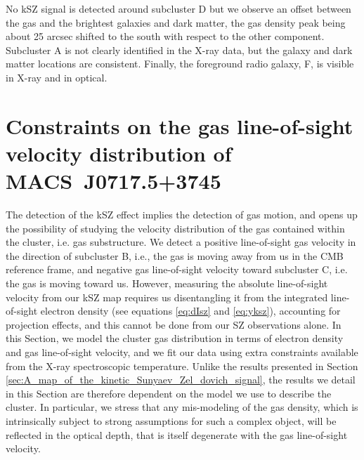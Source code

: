 \documentclass[twocolumn,traditabstract]{aa}
\begin{document}
No kSZ signal is detected around subcluster D but we observe an offset between the gas and the brightest galaxies and dark matter, the gas density peak being about 25 arcsec shifted to the south with respect to the other component. Subcluster A is not clearly identified in the X-ray data, but the galaxy and dark matter locations are consistent. Finally, the foreground radio galaxy, F, is visible in X-ray and in optical.

\section{Constraints on the gas line-of-sight velocity distribution of \mbox{MACS~J0717.5+3745}}\label{sec:constraint_on_the_gas_line_of_sight_velocity_distribution_of_MACSJ0717}
The detection of the kSZ effect implies the detection of gas motion, and opens up the possibility of studying the velocity distribution of the gas contained within the cluster, i.e. gas substructure. We detect a positive line-of-sight gas velocity in the direction of subcluster B, i.e., the gas is moving away from us in the CMB reference frame, and negative gas line-of-sight velocity toward subcluster C, i.e. the gas is moving toward us. However, measuring the absolute line-of-sight velocity from our kSZ map requires us disentangling it from the integrated line-of-sight electron density (see equations \ref{eq:dIsz} and \ref{eq:yksz}), accounting for projection effects, and this cannot be done from our SZ observations alone. In this Section, we model the cluster gas distribution in terms of electron density and gas line-of-sight velocity, and we fit our data using extra constraints available from the X-ray spectroscopic temperature. Unlike the results presented in Section \ref{sec:A_map_of_the_kinetic_Sunyaev_Zel_dovich_signal}, the results we detail in this Section are therefore dependent on the model we use to describe the cluster. In particular, we stress that any mis-modeling of the gas density, which is intrinsically subject to strong assumptions for such a complex object, will be reflected in the optical depth, that is itself degenerate with the gas line-of-sight velocity.

\end{document}
